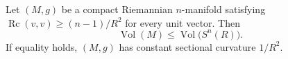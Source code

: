 \begin{corollary}
\label{cor:ricci-volume-comparison}

Let $(M,g)$ be a compact Riemannian $n$-manifold satisfying
$\operatorname{Rc}(v,v)\geq(n-1)/R^2$ for every unit vector. Then
\[
\operatorname{Vol}(M)
\leq\operatorname{Vol}\bigl(S^n(R)\bigr).
\]
If equality holds, $(M,g)$ has constant sectional curvature $1/R^2$.
\end{corollary}
